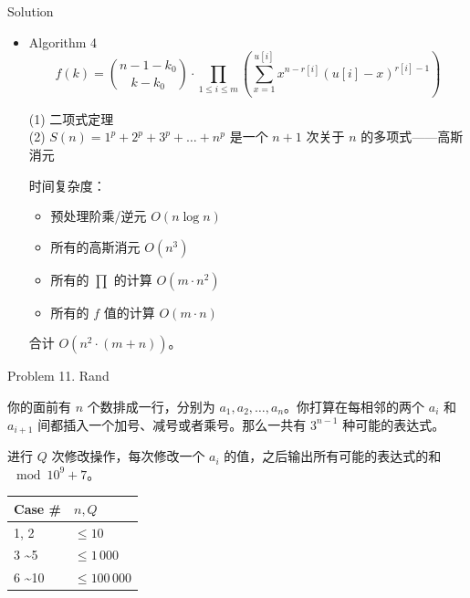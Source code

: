 \documentclass[UTF8]{beamer}
\begin{document}
\begin{frame}{Solution}

\begin{itemize}
    \item Algorithm 4 \\
        $$
            f(k) =
                \binom{n - 1 - k_0}{k - k_0} \cdot
                \prod_{1 \leq i \leq m}
                \left( \sum_{x = 1}^{u[i]} x^{n - r[i]} (u[i] - x)^{r[i] - 1} \right)
        $$

        \pause (1) 二项式定理 \\
        \pause
        (2) $ S(n) = 1^p + 2^p + 3^p + \dots + n^p $
        是一个 $n + 1$ 次关于 $n$ 的多项式——高斯消元

        \pause 时间复杂度：\begin{itemize}
            \item 预处理阶乘/逆元 $O(n \log n)$
            \item 所有的高斯消元 $O(n^3)$
            \item 所有的 $\prod$ 的计算 $O(m \cdot n^2)$
            \item 所有的 $f$ 值的计算 $O(m \cdot n)$
        \end{itemize}
        合计 $O(n^2 \cdot (m + n))$。
\end{itemize}

\end{frame}


\begin{frame}{Problem 11. Rand}

你的面前有 $n$ 个数排成一行，分别为 $a_1, a_2, \dots, a_n$。你打算在每相邻的两个
$a_i$ 和 $a_{i+1}$ 间都插入一个加号、减号或者乘号。那么一共有 $3^{n-1}$ 种可能的表达式。

进行 $Q$ 次修改操作，每次修改一个 $a_i$ 的值，之后输出所有可能的表达式的和 $\mod 10^9 + 7$。

\begin{tabularx}{\textwidth}{X|X} \hline
Case \# & $n, Q$ \\ \hline \hline
1, 2                 & $\leq 10$       \\ \hline
3 \textasciitilde 5  & $\leq 1\,000$   \\ \hline
6 \textasciitilde 10 & $\leq 100\,000$ \\ \hline
\end{tabularx}

\end{frame}
\end{document}
